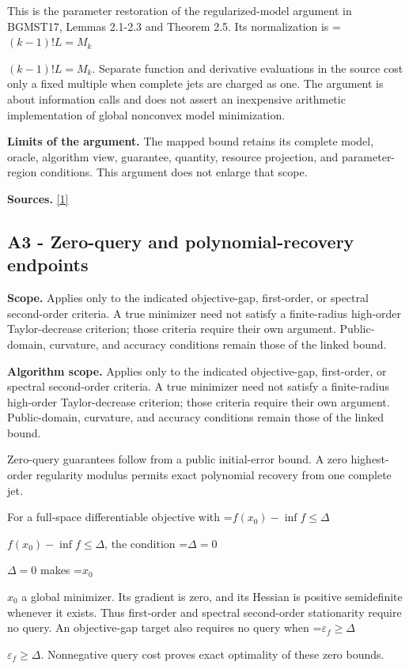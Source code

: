 \documentclass[10pt,a4paper]{article}
\newcommand{\AtlasMath}[1]{\par\begingroup\centering\setbox0=\hbox{$\displaystyle #1$}\ifdim\wd0>1.4\linewidth\typeout{ATLAS WIDE FORMULA: \the\wd0}\fi\ifdim\wd0>\linewidth\resizebox{\linewidth}{!}{\box0}\else\box0\fi\par\endgroup}
\newcommand{\AtlasInlineMath}[1]{\begingroup\setbox0=\hbox{$#1$}\ifdim\wd0>.4\linewidth\endgroup\AtlasMath{#1}\else\endgroup$#1$\fi}
\begin{document}
This is the parameter restoration of the regularized-model argument in BGMST17, Lemmas 2.1-2.3 and Theorem 2.5. Its normalization is \AtlasInlineMath{(k-1)!L=M_k}. Separate function and derivative evaluations in the source cost only a fixed multiple when complete jets are charged as one. The argument is about information calls and does not assert an inexpensive arithmetic implementation of global nonconvex model minimization.

\textbf{Limits of the argument.} The mapped bound retains its complete model, oracle, algorithm view, guarantee, quantity, resource projection, and parameter-region conditions. This argument does not enlarge that scope.

\textbf{Sources.} \href{https://optimization-online.org/wp-content/uploads/2015/06/4970.pdf}{[1]}

\subsection{A3 - Zero-query and polynomial-recovery endpoints}
\textbf{Scope.} Applies only to the indicated objective-gap, first-order, or spectral second-order criteria. A true minimizer need not satisfy a finite-radius high-order Taylor-decrease criterion; those criteria require their own argument. Public-domain, curvature, and accuracy conditions remain those of the linked bound.

\textbf{Algorithm scope.} Applies only to the indicated objective-gap, first-order, or spectral second-order criteria. A true minimizer need not satisfy a finite-radius high-order Taylor-decrease criterion; those criteria require their own argument. Public-domain, curvature, and accuracy conditions remain those of the linked bound.

Zero-query guarantees follow from a public initial-error bound. A zero highest-order regularity modulus permits exact polynomial recovery from one complete jet.

For a full-space differentiable objective with \AtlasInlineMath{f(x_0)-\inf f\le\Delta}, the condition \AtlasInlineMath{\Delta=0} makes \AtlasInlineMath{x_0} a global minimizer. Its gradient is zero, and its Hessian is positive semidefinite whenever it exists. Thus first-order and spectral second-order stationarity require no query. An objective-gap target also requires no query when \AtlasInlineMath{\varepsilon_f\ge\Delta}. Nonnegative query cost proves exact optimality of these zero bounds.
\end{document}

